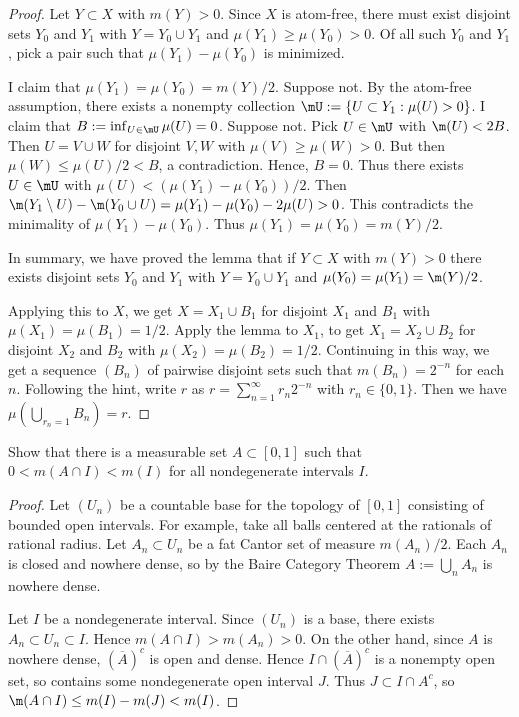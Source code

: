\documentclass{article}
\begin{document}
\begin{proof}
Let $Y \subset X$ with $m(Y) > 0$. Since $X$ is atom-free, there must exist disjoint sets $Y_0$ and $Y_1$ with $Y = Y_0 \cup Y_1$ and $\mu(Y_1) \ge \mu(Y_0) > 0$.  Of all such $Y_0$ and $Y_1$, pick a pair such that $\mu(Y_1) - \mu(Y_0)$ is minimized. 

I claim that $\mu(Y_1) = \mu(Y_0) = m(Y)/2$.  Suppose not.  By the atom-free assumption, there exists a nonempty collection $\mU := \{ U \subset Y_1 : \mu(U) > 0 \}$.  I claim that $B := \inf_{U \in \mU} \mu(U) = 0$.  Suppose not.  Pick $U \in \mU$ with $\m(U) < 2 B$.  Then $U = V \cup W$ for disjoint $V,W$ with $\mu(V) \ge \mu(W) > 0$.  But then $\mu(W) \le \mu(U)/2 < B$, a contradiction.  Hence, $B = 0$.  Thus there exists $U \in \mU$ with $\mu(U) < (\mu(Y_1) - \mu(Y_0))/2$.  Then $\m(Y_1 \setminus U) - \m(Y_0 \cup U) = \mu(Y_1) - \mu(Y_0) - 2\mu(U) > 0$.  This contradicts the minimality of $\mu(Y_1) - \mu(Y_0)$. Thus $\mu(Y_1) = \mu(Y_0) = m(Y)/2$.

In summary, we have proved the lemma that if $Y \subset X$ with $m(Y) > 0$ there exists disjoint sets $Y_0$ and $Y_1$ with $Y = Y_0 \cup Y_1$ and $\mu(Y_0) = \mu(Y_1)  = \m(Y)/2$.

Applying this to $X$, we get $X = X_1 \cup B_1$ for disjoint $X_1$ and $B_1$ with $\mu(X_1) = \mu(B_1) = 1/2$.    Apply the lemma to $X_1$, to get $X_1 = X_2 \cup B_2$ for disjoint $X_2$ and $B_2$ with $\mu(X_2) = \mu(B_2) = 1/2$. Continuing in this way, we get a sequence $(B_n)$ of pairwise disjoint sets such that $m(B_n) = 2^{-n}$ for each $n$. Following the hint, write $r$ as $r = \sum_{n=1}^\infty r_n2^{-n}$ with $r_n \in \{0, 1\}$.  Then we have $\mu(\bigcup_{r_n=1} B_n) = r$.

\end{proof}

 Show that there is a measurable set $A \subset [0,1]$ such that $0 < m(A\cap I) < m(I)$ for all nondegenerate intervals $I$.
\begin{proof}
Let $(U_n)$ be a countable base for the topology of $[0,1]$ consisting of bounded open intervals.  For example, take all balls centered at the rationals of rational radius. Let $A_n \subset U_n$ be a fat Cantor set of measure $m(A_n)/2$. Each $A_n$ is closed and nowhere dense, so by the Baire Category Theorem $A := \bigcup_n A_n$ is nowhere dense.  

Let $I$ be a nondegenerate interval.  Since $(U_n)$ is a base, there exists $A_n \subset U_n \subset I$.  Hence $m(A \cap I) > m(A_n) > 0$.   On the other hand, since $A$ is nowhere dense, $(\overline A)^c$ is open and dense.  Hence $I \cap (\overline A)^c$ is a nonempty open set, so contains some nondegenerate open interval $J$.  Thus $J \subset I \cap A^c$, so $\m(A \cap I) \le m(I) - m(J) < m(I)$.

\end{proof}
\end{document}
